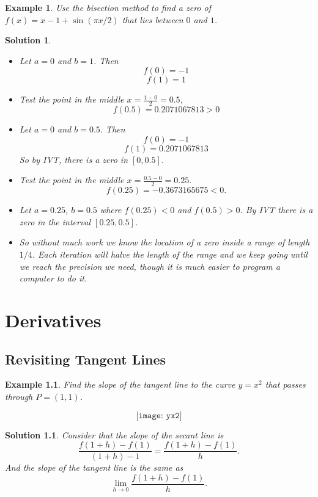 \documentclass[12pt,a4paper]{book}
\newtheorem{Example}[theorem]{Example}
\numberwithin{equation}{section}
\newtheorem*{solution}{{\bf Solution}}
\begin{document}
\begin{Example}
	Use the bisection method to find a zero of 
	$f(x)=x-1+\sin(\pi x/2)$ that lies between $0$ and $1$.
\end{Example}

\begin{solution}
	\begin{itemize}
		\item 
	Let $a=0$ and $b=1$. Then 
	$$f(0)=-1$$
	$$f(1)=1$$
	\item Test the point in the middle $x=\frac{1-0}{2}=0.5$, 
	$$f(0.5)=0.2071067813>0$$
	\item Let $a=0$ and $b=0.5$. Then 
	$$ f(0)=-1 $$
	$$ f(1)= 0.2071067813$$
	So by IVT, there is a zero in $[0,0.5]$.
	\item Test the point in the middle $x=\frac{0.5-0}{2}=0.25.$
	$$ f(0.25)=-0.3673165675 <0.$$
	\item Let $a = 0.25$, $b = 0.5$ where $f (0.25)<0$ and $f (0.5)>0$. By IVT there is a zero in the interval $[0.25,0.5]$.
	\item So without much work we know the location of a zero inside a range of length $1/4$. Each iteration will halve the length of the range and we keep going until we reach the precision we need, though it is much easier to program a computer to do it.
\end{itemize}
\end{solution}
%

\chapter{Derivatives}

\section{Revisiting Tangent Lines}

\begin{tcolorbox}[width=\textwidth,colback={green!20},title={},colbacktitle=yellow,coltitle=blue]
\begin{Example}
	Find the slope of the tangent line to the curve $y=x^2$ that passes through $P=(1,1)$.
\end{Example}
$$
\texttt{[image: yx2]}
$$

\begin{solution}
	Consider that the slope of the secant line is 
	$$ \frac{f(1+h)-f(1)}{(1+h)-1}=\frac{f(1+h)-f(1)}{h}.$$
	And the slope of the tangent line is the same as 
	$$\lim_{h\to 0}\frac{f(1+h)-f(1)}{h}.$$
\end{solution}
\end{tcolorbox}
\end{document}
